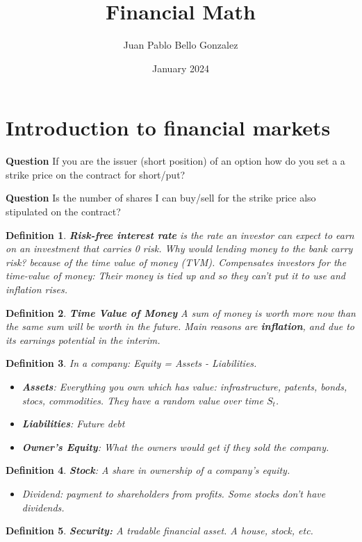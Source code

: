 \documentclass{article}
\title{Financial Math}
\author{Juan Pablo Bello Gonzalez}
\date{January 2024}
\newtheorem{definition}{Definition}
\begin{document}
\section{Introduction to financial markets}

\textbf{Question} If you are the issuer (short position) of an option how do you set a a strike price on the contract for short/put?

\textbf{Question} Is the number of shares I can buy/sell for the strike price also stipulated on the contract?

\begin{definition}
\textbf{Risk-free interest rate} is the rate an investor can expect to earn on an investment that carries 0 risk. Why would lending money to the bank carry risk? because of the time value of money (TVM). Compensates investors for the time-value of money: Their money is tied up and so they can't put it to use and inflation rises.
\end{definition}

\begin{definition}
\textbf{Time Value of Money}
A sum of money is worth more now than the same sum will be worth in the future. Main reasons are \textbf{inflation}, and due to its earnings potential in the interim.
\end{definition}

\begin{definition}
In a company: \textit{Equity = Assets - Liabilities}. 
\begin{itemize}
\item \textbf{Assets}: Everything you own which has value: infrastructure, patents, bonds, stocs, commodities. They have a random value over time $S_t$. 
\item \textbf{Liabilities}: Future debt 
\item \textbf{Owner's Equity}: What the owners would get if they sold the company. 
\end{itemize}
\end{definition}

\begin{definition}
\textbf{Stock}: A share in ownership of a company's equity. 
\begin{itemize}
\item Dividend: payment to shareholders from profits. Some stocks don't have dividends. 
\end{itemize}
\end{definition}

\begin{definition}
\textbf{Security:} A tradable financial asset. A house, stock, etc. 
\end{definition}
\end{document}
